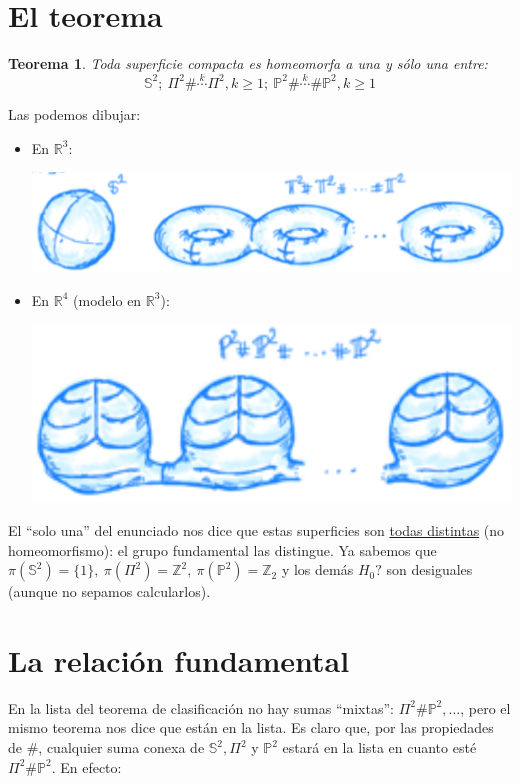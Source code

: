 \documentclass[10pt,a4paper,openright]{book}
\theoremstyle{break}
\newtheorem*{theo}{Teorema}
\begin{document}
\section{El teorema}%
\label{sec:el_teorema}
\begin{theo}
Toda superficie compacta es homeomorfa a una y sólo una entre:
\[
\mathbb{S}^{2};\ \Pi^2 \# \stackrel{k}{\cdots} \Pi^2, k\ge 1;\ \mathbb{P}^{2} \# \stackrel{k}{\cdots} \# \mathbb{P}^{2}, k\ge 1 
\]
\end{theo}
Las podemos dibujar:
\begin{itemize}
    \item En $\mathbb{R}^{3}$:
    \begin{center}
        \includegraphics[scale=0.3]{images/superficies_r3} 
    \end{center}
    \item En $\mathbb{R}^{4}$ (modelo en $\mathbb{R}^{3}$):
    \begin{center}
        \includegraphics[scale=0.3]{images/superficies_r4} 
    \end{center}
\end{itemize}
El ``solo una'' del enunciado nos dice que estas superficies son \underline{todas distintas} (no homeomorfismo): el grupo fundamental las distingue. Ya sabemos que $\pi\left( \mathbb{S}^{2} \right) = \{1\},\ \pi\left( \Pi^2 \right) = \mathbb{Z}^2,\ \pi\left( \mathbb{P}^{2} \right) = \mathbb{Z}_2$ y los demás $H_0?$ son desiguales (aunque no sepamos calcularlos).

\section{La relación fundamental}%
\label{sec:la_relacion_fundamental}
En la lista del teorema de clasificación no hay sumas ``mixtas'': $\Pi^2 \# \mathbb{P}^{2},\ldots$, pero el mismo teorema nos dice que están en la lista. Es claro que, por las propiedades de $\#$, cualquier suma conexa de $\mathbb{S}^{2}, \Pi^2$ y $\mathbb{P}^{2}$ estará en la lista en cuanto esté $\Pi^2 \# \mathbb{P}^{2}$. En efecto:
\end{document}
